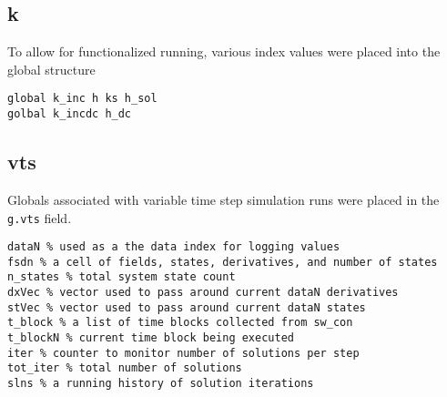 \subsection{k}  
To allow for functionalized running, various index values were placed into the global structure

\begin{verbatim}
global k_inc h ks h_sol
golbal k_incdc h_dc
\end{verbatim}

\subsection{vts}  
Globals associated with variable time step simulation runs were placed in the \verb|g.vts| field.

\begin{verbatim}
dataN % used as a the data index for logging values
fsdn % a cell of fields, states, derivatives, and number of states
n_states % total system state count
dxVec % vector used to pass around current dataN derivatives
stVec % vector used to pass around current dataN states
t_block % a list of time blocks collected from sw_con
t_blockN % current time block being executed
iter % counter to monitor number of solutions per step
tot_iter % total number of solutions
slns % a running history of solution iterations
\end{verbatim}



\begin{comment}

template for subparagraphs

\subsection{xxx} %
\begin{verbatim}

\end{verbatim}




\end{comment}
